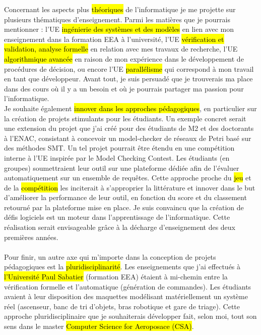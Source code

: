 Concernant les aspects plus \hl{théoriques} de l'informatique je me projette sur
plusieurs thématiques d'enseignement. Parmi les matières que je pourrais
mentionner : l'UE \og \hl{ingénierie des systèmes et des modèles} \fg en lien
avec mon enseignement dans la formation EEA à l'université, l'UE \og
\hl{vérification et validation, analyse formelle} \fg en relation avec mes
travaux de recherche, l'UE \og \hl{algorithmique avancée} \fg en raison de mon
expérience dans le développement de procédures de décision, ou encore l'UE \og
\hl{parallélisme} \fg qui correspond à mon travail en tant que développeur.
Avant tout, je suis persuadé que je trouverais ma place dans des cours où il y a
un besoin et où je pourrais partager ma passion pour l'informatique.\\


Je souhaite également \hl{innover dans les approches pédagogiques}, en
particulier sur la création de projets stimulants pour les étudiants. Un exemple
concret serait une extension du projet que j'ai créé pour des étudiants de M2 et
des doctorants à l'ENAC, consistant à concevoir un model-checker de réseaux de
Petri basé sur des méthodes SMT. Un tel projet pourrait être étendu en une
compétition interne à l'UE inspirée par le Model Checking Contest. Les étudiants
(en groupes) soumettraient leur outil sur une plateforme dédiée afin de
l'évaluer automatiquement sur un ensemble de requêtes. Cette approche proche du
\hl{jeu} et de la \hl{compétition} les inciterait à s'approprier la littérature
et innover dans le but d'améliorer la performance de leur outil, en fonction du
score et du classement retourné par la plateforme mise en place. Je suis
convaincu que la création de défis logiciels est un moteur dans l'apprentissage
de l'informatique. Cette réalisation serait envisageable grâce à la décharge
d'enseignement des deux premières années.\\\\


Pour finir, un autre axe qui m'importe dans la conception de projets
pédagogiques est la \hl{pluridisciplinarité}. Les enseignements que j'ai
effectués à \hl{l'Université Paul Sabatier} (formation EEA) étaient à mi-chemin entre
la vérification formelle et l'automatique (génération de commandes). Les
étudiants avaient à leur disposition des maquettes modélisant matériellement un
système réel (ascenseur, banc de tri d'objets, bras robotique et gare de
triage). Cette approche pluridisciplinaire que je souhaiterais développer fait,
selon moi, tout son sens dans le master \hl{Computer Science for Aeroposace (CSA)}.\\